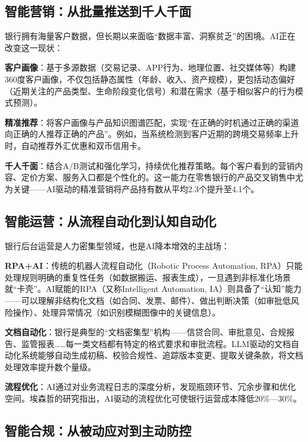 \subsection{智能营销：从批量推送到千人千面}

银行拥有海量客户数据，但长期以来面临``数据丰富、洞察贫乏''的困境。AI正在改变这一现状：

\textbf{客户画像}：基于多源数据（交易记录、APP行为、地理位置、社交媒体等）构建360度客户画像，不仅包括静态属性（年龄、收入、资产规模），更包括动态偏好（近期关注的产品类型、生命阶段变化信号）和潜在需求（基于相似客户的行为模式预测）。

\textbf{精准推荐}：将客户画像与产品知识图谱匹配，实现``在正确的时机通过正确的渠道向正确的人推荐正确的产品''。例如，当系统检测到客户近期的跨境交易频率上升时，自动推荐外汇优惠和双币信用卡。

\textbf{千人千面}：结合A/B测试和强化学习，持续优化推荐策略。每个客户看到的营销内容、定价方案、服务入口都是个性化的。这一能力在零售银行的产品交叉销售中尤为关键——AI驱动的精准营销将产品持有数从平均2.3个提升至4.1个\parencite{pwc2023ai}。

\subsection{智能运营：从流程自动化到认知自动化}

银行后台运营是人力密集型领域，也是AI降本增效的主战场：

\textbf{RPA+AI}：传统的机器人流程自动化（Robotic Process Automation, RPA）只能处理规则明确的重复性任务（如数据搬运、报表生成），一旦遇到非标准化场景就``卡壳''。AI赋能的RPA（又称Intelligent Automation, IA）则具备了``认知''能力——可以理解非结构化文档（如合同、发票、邮件）、做出判断决策（如审批低风险操作）、处理异常情况（如识别模糊图像中的关键信息）。

\textbf{文档自动化}：银行是典型的``文档密集型''机构——信贷合同、审批意见、合规报告、监管报表……每一类文档都有特定的格式要求和审批流程。LLM驱动的文档自动化系统能够自动生成初稿、校验合规性、追踪版本变更、提取关键条款，将文档处理效率提升数个量级。

\textbf{流程优化}：AI通过对业务流程日志的深度分析，发现瓶颈环节、冗余步骤和优化空间。埃森哲的研究指出，AI驱动的流程优化可使银行运营成本降低20\%—30\%\parencite{accenture2023banking}。

\subsection{智能合规：从被动应对到主动防控}

